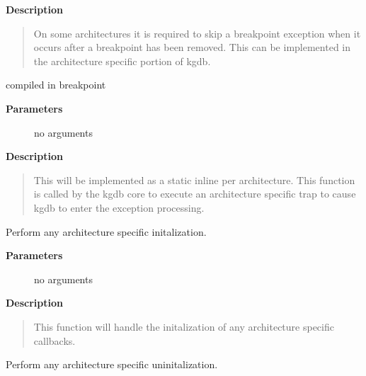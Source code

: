 \documentclass[a4paper,8pt,english]{sphinxmanual}
\begin{document}
\textbf{Description}
\begin{quote}

On some architectures it is required to skip a breakpoint
exception when it occurs after a breakpoint has been removed.
This can be implemented in the architecture specific portion of kgdb.
\end{quote}

\begin{fulllineitems}
\label{dev-tools/kgdb:c.kgdb_breakpoint}
compiled in breakpoint

\end{fulllineitems}


\textbf{Parameters}
\begin{description}
\item[{}] \leavevmode
no arguments

\end{description}

\textbf{Description}
\begin{quote}

This will be implemented as a static inline per architecture.  This
function is called by the kgdb core to execute an architecture
specific trap to cause kgdb to enter the exception processing.
\end{quote}

\begin{fulllineitems}
\label{dev-tools/kgdb:c.kgdb_arch_init}
Perform any architecture specific initalization.

\end{fulllineitems}


\textbf{Parameters}
\begin{description}
\item[{}] \leavevmode
no arguments

\end{description}

\textbf{Description}
\begin{quote}

This function will handle the initalization of any architecture
specific callbacks.
\end{quote}

\begin{fulllineitems}
\label{dev-tools/kgdb:c.kgdb_arch_exit}
Perform any architecture specific uninitalization.

\end{fulllineitems}
\end{document}
